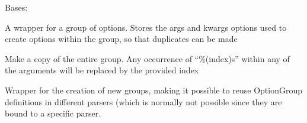 \documentclass[letterpaper,10pt,english]{sphinxmanual}
\begin{document}
\begin{fulllineitems}
\label{index:encore.utils.OptionGroup}
Bases: 

A wrapper for a group of options. Stores the args and kwargs options
used to create options within the group, so that duplicates can be
made

\begin{fulllineitems}
\label{index:encore.utils.OptionGroup.add_option}
\end{fulllineitems}


\begin{fulllineitems}
\label{index:encore.utils.OptionGroup.duplicate}
Make a copy of the entire group. Any occurrence of ``\%(index)s''
within any of the arguments will be replaced by the provided index

\end{fulllineitems}


\end{fulllineitems}


\begin{fulllineitems}
\label{index:encore.utils.OptionGroups}
Wrapper for the creation of new groups, making it possible to reuse
OptionGroup definitions in different parsers (which is normally not
possible since they are bound to a specific parser.

\begin{fulllineitems}
\label{index:encore.utils.OptionGroups.add_group}
\end{fulllineitems}


\end{fulllineitems}

\end{document}
